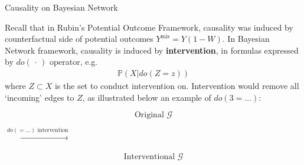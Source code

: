 \begin{point}
    Causality on Bayesian Network
\end{point}

Recall that in Rubin's Potential Outcome Framework, causality was induced by counterfactual side of potential outcomes $ Y^\mathrm{mis} = Y(1-W)  $. In Bayesian Network framework, causality is induced by \textbf{intervention}, in formulas expressed by $ do(\, \cdot \, ) $ operator, e.g.
\begin{align*}
    \mathbb{P}\left( X |do(Z=z) \right)  
\end{align*}
where $ Z\subset X  $ is the set to conduct intervention on. Intervention would remove all `incoming' edges to $ Z $, as illustrated below an example of $ do(3=...) $:

\begin{center}
    \begin{minipage}{0.23\linewidth}
        \begin{figure}[H]
        \centering            
        $$ \text{Original }\mathcal{G} $$       
        \end{figure}
    \end{minipage}\quad $ \xrightarrow[]{do(=...)\text{ intervention}}  $
    \begin{minipage}{0.23\linewidth}
        \begin{figure}[H]
        \centering            
        $$ \text{Interventional }\mathcal{G} $$       
        \end{figure}
    \end{minipage}
\end{center}

